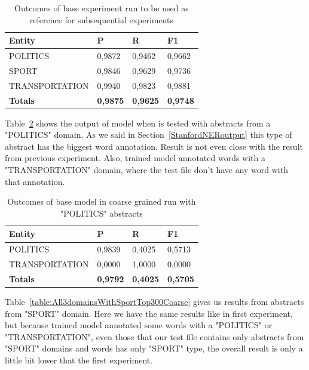 \documentclass[thesis=M,english]{FITthesis}[2018/05/30]
\begin{document}
	\begin{table}[H]\centering
		\begin{tabular}{|l|l|l|l|}
			\hline {\textbf{Entity}} & {\textbf{P}} & {\textbf{R}} & {\textbf{F1}}\\\hline
				POLITICS & 0,9872 & 0,9462 & 0,9662\\
				SPORT & 0,9846 & 0,9629 & 0,9736\\
				TRANSPORTATION & 0,9940 & 0,9823 & 0,9881\\\hline
				\textbf{Totals} & \textbf{0,9875} & \textbf{0,9625} & \textbf{0,9748}\\\hline
		\end{tabular}
		\caption{Outcomes of base experiment run to be used as reference for subsequential experiments \label{table:All3domainsWithAll3DomiansTop300Coarse}}
	\end{table}	
	
	Table~\ref{table:All3domainsWithPoliticsTop300Coarse} shows the output of model when is tested with abstracts from a "POLITICS" domain. As we said in Section~\ref{StanfordNERoutput} this type of abstract has the biggest word annotation. Result is not even close with the result from previous experiment. Also, trained model annotated words with a "TRANSPORTATION" domain, where the test file don't have any word with that annotation. 
	
	\begin{table}[H]\centering
		\begin{tabular}{|l|l|l|l|}
			\hline {\textbf{Entity}} & {\textbf{P}} & {\textbf{R}} & {\textbf{F1}}\\\hline
				POLITICS & 0,9839 & 0,4025 & 0,5713\\
				TRANSPORTATION & 0,0000 & 1,0000 & 0,0000\\\hline
				\textbf{Totals} & \textbf{0,9792} & \textbf{0,4025} & \textbf{0,5705}\\\hline
		\end{tabular}
		\caption{Outcomes of base model in coarse grained run with "POLITICS" abstracts\label{table:All3domainsWithPoliticsTop300Coarse}}
	\end{table}	
	
	Table~\ref{table:All3domainsWithSportTop300Coarse} gives us results from abstracts from "SPORT" domain. Here we have the same results like in first experiment, but because trained model annotated some words with a "POLITICS" or "TRANSPORTATION", even those that our test file contains only abstracts from "SPORT" domains and words has only "SPORT" type, the overall result is only a little bit lower that the first experiment.
\end{document}
